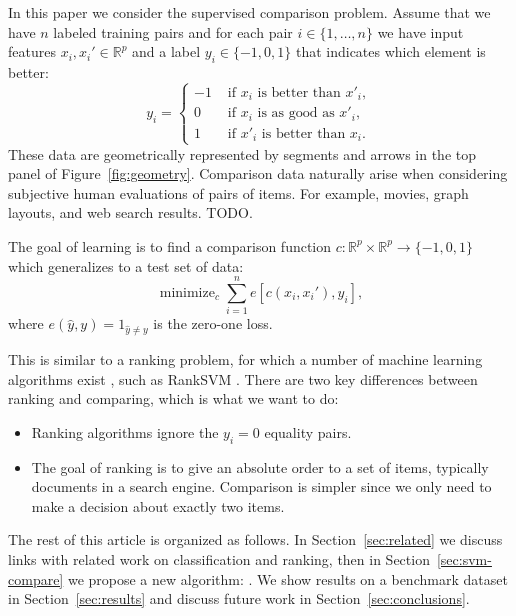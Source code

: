 \documentclass{article}
\newcommand{\RR}{\mathbb R}
\DeclareMathOperator*{\minimize}{minimize}
\begin{document}
In this paper we consider the supervised comparison problem. Assume
that we have $n$ labeled training pairs and for each pair
$i\in\{1,\dots,n\}$ we have input features $x_i,x_i'\in\RR^p$ and a
label $y_i\in\{-1,0,1\}$ that indicates which element is better:
\begin{equation}
  \label{eq:z}
  y_i =
  \begin{cases}
    -1 & \text{ if $x_i$ is better than $x'_i$},\\
    0 & \text{ if $x_i$ is as good as $x'_i$},\\
    1 & \text{ if $x'_i$ is better than $x_i$}.
  \end{cases}
\end{equation}
These data are geometrically represented by segments and arrows in the
top panel of Figure~\ref{fig:geometry}. Comparison data naturally
arise when considering subjective human evaluations of pairs of
items. For example, movies, graph layouts, and web
search results. TODO.

The goal of learning is to find a comparison function $c:\RR^p \times
\RR^p \rightarrow \{-1,0,1\}$ which generalizes to a test set of data:
\begin{equation}
  \minimize_{c} 
  \sum_{i=1}^n
  e\left[ c(x_i, x_i'), y_i \right],
\end{equation}
where $e(\hat y, y) = 1_{\hat y \neq y}$ is the zero-one loss.

This is similar to a ranking problem, for which a number of machine
learning algorithms exist \citep{learning-to-rank}, such as RankSVM
\citep{ranksvm}. There are two key differences between ranking and
comparing, which is what we want to do:
\begin{itemize}
\item Ranking algorithms ignore the $y_i=0$ equality pairs.
\item The goal of ranking is to give an absolute order to a set of
  items, typically documents in a search engine. Comparison is simpler
  since we only need to make a decision about exactly two items.
\end{itemize}

The rest of this article is organized as follows. In
Section~\ref{sec:related} we discuss links with related work on
classification and ranking, then in Section~\ref{sec:svm-compare} we
propose a new algorithm: . We show results on a benchmark
dataset in Section~\ref{sec:results} and discuss future work in
Section~\ref{sec:conclusions}.
\end{document}
